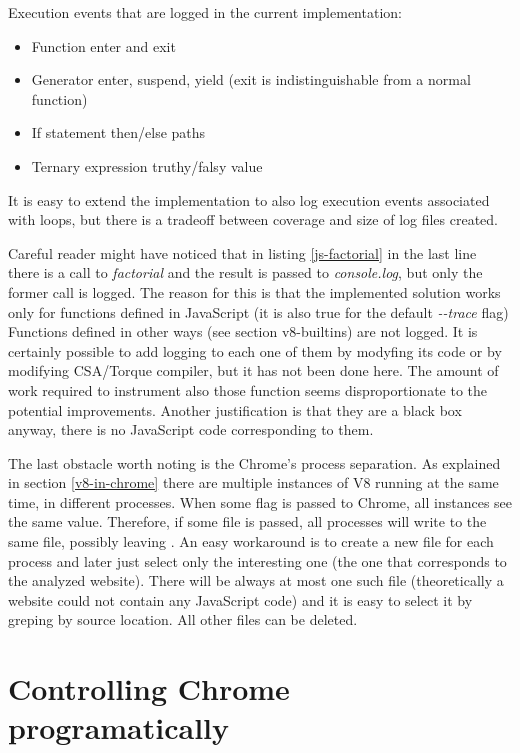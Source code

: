 Execution events that are logged in the current implementation:
\begin{itemize}
  \item Function enter and exit
  \item Generator enter, suspend, yield (exit is indistinguishable from a normal function)
  \item If statement then/else paths
  \item Ternary expression truthy/falsy value
\end{itemize}

It is easy to extend the implementation to also log execution events associated with loops, but there
is a tradeoff between coverage and size of log files created.
	


Careful reader might have noticed that in listing \ref{js-factorial} in the last line there is a call to \emph{factorial}
and the result is passed to \emph{console.log}, but only the former call is logged.
The reason for this is that the implemented solution works only for functions defined in JavaScript
(it is also true for the default \emph{-{}-trace} flag)
Functions defined in other ways (see section v8-builtins) are not logged. It is certainly possible
to add logging to each one of them by modyfing its code or by modifying CSA/Torque compiler,
but it has not been done here. The amount of work required to instrument also those function
seems disproportionate to the potential improvements. Another justification is that they are
a black box anyway, there is no JavaScript code corresponding to them.

The last obstacle worth noting is the Chrome's process separation. As explained in section \ref{v8-in-chrome}
there are multiple instances of V8 running at the same time, in different processes.
When some flag is passed to Chrome, all instances see the same value. Therefore, if some file is passed,
all processes will write to the same file, possibly leaving . An easy workaround is to create a new file 
for each process and later just select only the interesting one (the one that corresponds to the
analyzed website). There will be always at most one such file (theoretically a website could not contain
any JavaScript code) and it is easy to select it by greping by source location. All other files can be deleted.



\section{Controlling Chrome programatically}


